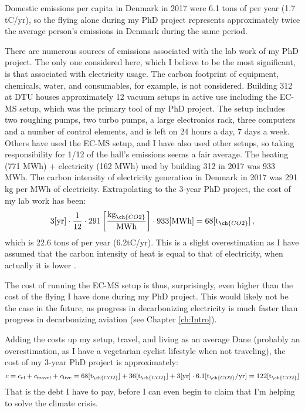 Domestic  emissions per capita in Denmark in 2017 were 6.1 tons of  per year\cite{Ritchie2019a} (1.7 tC/yr), so the flying alone during my PhD project represents approximately twice the average person's  emissions in Denmark during the same period. 

There are numerous sources of  emissions associated with the lab work of my PhD project. The only one considered here, which I believe to be the most significant, is that associated with electricity usage. The carbon footprint of equipment, chemicals, water, and consumables, for example, is not considered. Building 312 at DTU houses approximately 12 vacuum setups in active use including the EC-MS setup, which was the primary tool of my PhD project. The setup includes two roughing pumps, two turbo pumps, a large electronics rack, three computers and a number of control elements, and is left on 24 hours a day, 7 days a week. Others have used the EC-MS setup, and I have also used other setups, so taking responsibility for 1/12 of the hall's  emissions seems a fair average. The heating (771 MWh) + electricity (162 MWh) used by building 312 in 2017 was 933 MWh. The carbon intensity of electricity generation in Denmark in 2017 was 291 kg  per MWh of electricity\cite{DanishEnergyAgency}. Extrapolating to the 3-year PhD project, the  cost of my lab work has been:
\begin{equation}
3 \text{[yr]} \cdot \frac{1}{12} \cdot 291 \left[\frac{\text{kg}_{\ch{CO2}}}{\text{MWh}}\right] \cdot 933\text{[MWh]} = 68 [\text{t}_{\ch{CO2}}]\,,
\end{equation}
which is 22.6 tons of  per year (6.2tC/yr). This is a slight overestimation as I have assumed that the carbon intensity of heat is equal to that of electricity, when actually it is lower \cite{EnergiNet}. 

The  cost of running the EC-MS setup is thus, surprisingly, even higher than the  cost of the flying I have done during my PhD project. This would likely not be the case in the future, as progress in decarbonizing electricity is much faster than progress in decarbonizing aviation (see Chapter \ref{ch:Intro}). 

Adding the costs up my setup, travel, and living as an average Dane (probably an overestimation, as I have a vegetarian cyclist lifestyle when not traveling), the  cost of my 3-year PhD project is approximately:
\begin{equation}
c = c_\text{el} + c_\text{travel} + c_\text{live} = 68 [\text{t}_{\ch{CO2}}] + 36 [\text{t}_{\ch{CO2}}] + 3 \text{[yr]} \cdot 6.1  [\text{t}_{\ch{CO2}}/\text{yr}] = 122 [\text{t}_{\ch{CO2}}]\label{eq:costs}
\end{equation}
That is the debt I have to pay, before I can even begin to claim that I'm helping to solve the climate crisis.


